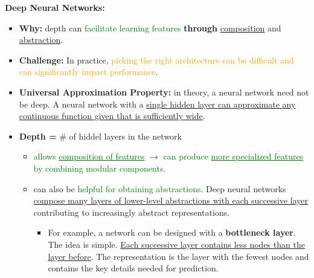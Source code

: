 \documentclass[12pt, a4paper]{article}
\begin{document}
\textbf{Deep Neural Networks:}
\begin{itemize}
  \item \textbf{Why:} depth can \textcolor{Green}{facilitate learning features} \textbf{through} \uline{composition} and \uline{abstraction}.
  \item \textbf{Challenge:} In practice, \textcolor{Orange}{picking the right architecture can be difficult and can significantly impact performance}.
  \item \textbf{Universal Approximation Property:} in theory, a neural network need not be deep. A neural network with a \uline{single hidden layer can approximate any continuous function given that is sufficiently wide}.
  \item \textbf{Depth =} \# of hiddel layers in the network
  \begin{itemize}
    \item \textcolor{Green}{allows \uline{composition of features}} $\rightarrow$ \textcolor{Green}{can produce \uline{more specialized features} by combining modular components.}
    \item can also be \textcolor{Green}{helpful for obtaining abstractions}. Deep neural networks \uline{compose many layers of lower-level abstractions with each successive layer} contributing to increasingly abstract representations.
    \begin{itemize}
      \item For example, a network can be designed with a \textbf{bottleneck layer}. The idea is simple. \uline{Each successive layer contains less nodes than the layer before}. The representation is the layer with the fewest nodes and contains the key details needed for prediction.
    \end{itemize}
  \end{itemize}
\end{itemize}
\end{document}
